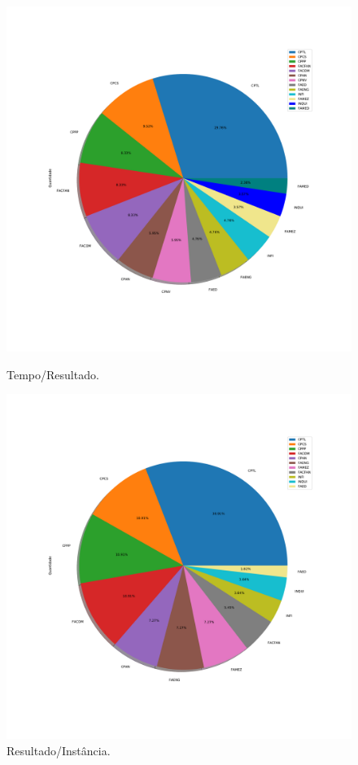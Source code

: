 \documentclass[a4paper, 12pt]{article}
\begin{document}
\begin{figure}[!htb]
    \centering
    \begin{minipage}{0.5\textwidth}
        \centering
        \includegraphics[width=1\textwidth]{../Resultados/img/pets_pie_2018.pdf}
        \caption{Tempo/Resultado.}
        \label{fig:scatter_topDown}
    \end{minipage}%
    \begin{minipage}{0.5\textwidth}
        \centering
        \includegraphics[width=1\textwidth]{../Resultados/img/pets_pie_2019.pdf}
        \caption{Resultado/Instância.}
        \label{fig:result_topDown}
    \end{minipage}
\end{figure}
\end{document}
